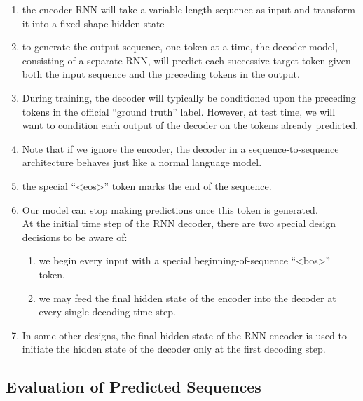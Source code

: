 \begin{enumerate}[itemsep=0.15cm]
    \item the encoder RNN will take a variable-length sequence as input and transform it into a fixed-shape hidden state

    \item to generate the output sequence, one token at a time, the decoder model, consisting of a separate RNN, will predict each successive target token given both the input sequence and the preceding tokens in the output. 
    
    \item During training, the decoder will typically be conditioned upon the preceding tokens in the official “ground truth” label. However, at test time, we will want to condition each output of the decoder on the tokens already predicted. 
    
    \item Note that if we ignore the encoder, the decoder in a sequence-to-sequence architecture behaves just like a normal language model.

    \item the special “<eos>” token marks the end of the sequence. 
    
    \item Our model can stop making predictions once this token is generated.\\
    At the initial time step of the RNN decoder, there are two special design decisions to be aware of: 
    \begin{enumerate}
        \item we begin every input with a special beginning-of-sequence “<bos>” token. 
    
        \item we may feed the final hidden state of the encoder into the decoder at every single decoding time step. 
    \end{enumerate}
    
    \item In some other designs, the final hidden state of the RNN encoder is used to initiate the hidden state of the decoder only at the first decoding step.


\end{enumerate}


\subsection{Evaluation of Predicted Sequences}







